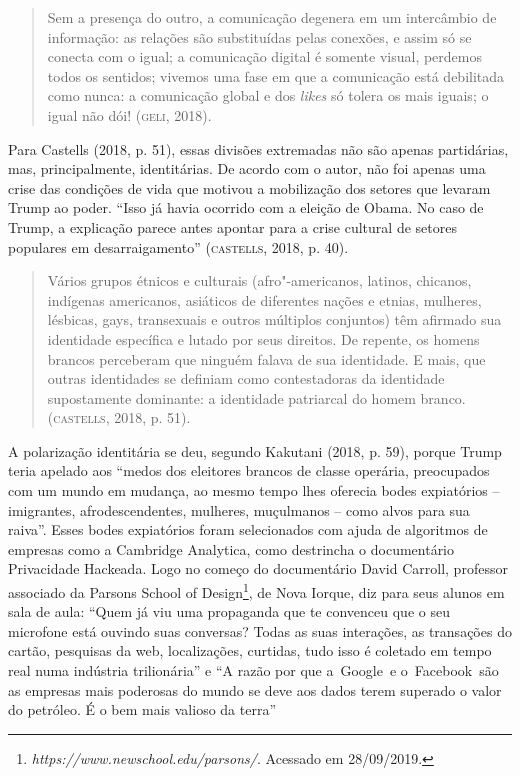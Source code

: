 \begin{quote}
Sem a presença do outro, a comunicação degenera em um intercâmbio de
informação: as relações são substituídas pelas conexões, e assim só se
conecta com o igual; a comunicação digital é somente visual, perdemos
todos os sentidos; vivemos uma fase em que a comunicação está debilitada
como nunca: a comunicação global e dos \emph{likes} só tolera os mais
iguais; o igual não dói! (\textsc{geli}, 2018).
\end{quote}

Para Castells (2018, p. 51), essas divisões extremadas não são apenas
partidárias, mas, principalmente, identitárias. De acordo com o autor,
não foi apenas uma crise das condições de vida que motivou a mobilização
dos setores que levaram Trump ao poder. ``Isso já havia ocorrido com a
eleição de Obama. No caso de Trump, a explicação parece antes apontar
para a crise cultural de setores populares em desarraigamento''
(\textsc{castells}, 2018, p. 40).

\begin{quote}
Vários grupos étnicos e culturais (afro"-americanos, latinos, chicanos,
indígenas americanos, asiáticos de diferentes nações e etnias, mulheres,
lésbicas, gays, transexuais e outros múltiplos conjuntos) têm afirmado
sua identidade específica e lutado por seus direitos. De repente, os
homens brancos perceberam que ninguém falava de sua identidade. E mais,
que outras identidades se definiam como contestadoras da identidade
supostamente dominante: a identidade patriarcal do homem branco.
(\textsc{castells}, 2018, p. 51).
\end{quote}

A polarização identitária se deu, segundo Kakutani (2018, p. 59), porque
Trump teria apelado aos ``medos dos eleitores brancos de classe
operária, preocupados com um mundo em mudança, ao mesmo tempo lhes
oferecia bodes expiatórios -- imigrantes, afrodescendentes, mulheres,
muçulmanos -- como alvos para sua raiva''. Esses bodes expiatórios foram
selecionados com ajuda de algoritmos de empresas como a Cambridge
Analytica, como destrincha o documentário Privacidade Hackeada. Logo no
começo do documentário David Carroll, professor associado da Parsons
School of Design\footnote{\emph{https://www.newschool.edu/parsons/}.
  Acessado em 28/09/2019.}, de Nova Iorque, diz para seus alunos em sala
de aula: ``Quem já viu uma propaganda que te convenceu que o seu
microfone está ouvindo suas conversas? Todas as suas interações, as
transações do cartão, pesquisas da web, localizações, curtidas, tudo
isso é coletado em tempo real numa indústria trilionária'' e ``A razão por
que a~Google~e o~Facebook~são as empresas mais poderosas do mundo se
deve aos dados terem superado o valor do petróleo. É o bem mais valioso
da terra''

